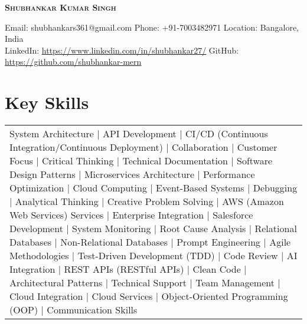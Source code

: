 \documentclass[letterpaper,11pt]{article}
\begin{document}

\begin{center}
    \textbf{\Huge \scshape Shubhankar Kumar Singh} \\[1pt]
    \small
     
    Email: shubhankars361@gmail.com \quad 
    Phone: +91-7003482971 \quad
    Location: Bangalore, India \quad \\
    LinkedIn: \href{https://www.linkedin.com/in/shubhankar27/}{\underline{https://www.linkedin.com/in/shubhankar27/}} \quad 
    GitHub: \href{https://github.com/shubhankar-mern}{\underline{https://github.com/shubhankar-mern}} \quad \\
    
\end{center}
\section{\textbf {Key Skills}}

\noindent
\begin{tabular}{p{\textwidth}}
System Architecture | API Development | CI/CD (Continuous Integration/Continuous Deployment) | Collaboration | Customer Focus | Critical Thinking | Technical Documentation | Software Design Patterns | Microservices Architecture | Performance Optimization | Cloud Computing | Event-Based Systems | Debugging | Analytical Thinking | Creative Problem Solving | AWS (Amazon Web Services) Services | Enterprise Integration | Salesforce Development | System Monitoring | Root Cause Analysis | Relational Databases | Non-Relational Databases | Prompt Engineering | Agile Methodologies | Test-Driven Development (TDD) | Code Review | AI Integration | REST APIs (RESTful APIs) | Clean Code | Architectural Patterns | Technical Support | Team Management | Cloud Integration | Cloud Services | Object-Oriented Programming (OOP) | Communication Skills
\end{tabular}

\end{document}
